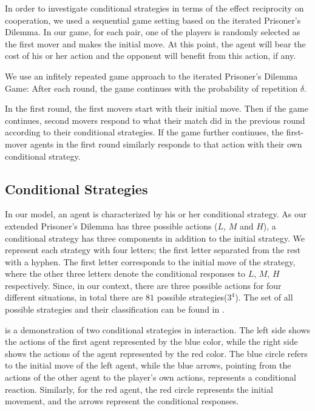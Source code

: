 \documentclass[12pt]{article}
\begin{document}
In order to investigate conditional strategies in terms of the effect reciprocity on cooperation, we used a sequential game setting based on the iterated Prisoner's Dilemma. In our game, for each pair, one of the players is randomly selected as the first mover and makes the initial move. At this point, the agent will bear the cost of his or her action and the opponent will benefit from this action, if any. 

We use an infitely repeated game approach to the iterated Prisoner's Dilemma Game: After each round, the game continues with the probability of repetition $\delta$. 

In the first round, the first movers start with their initial move. Then if the game continues, second movers respond to what their match did in the previous round according to their conditional strategies. If the game further continues, the first-mover agents in the first round similarly responds to that action with their own conditional strategy. 

\subsection{Conditional Strategies}
In our model, an agent is characterized by his or her conditional strategy. As our extended Prisoner's Dilemma has three possible actions ($L$, $M$ and $H$), a conditional strategy has three components in addition to the initial strategy. We represent each strategy with four letters; the first letter separated from the rest with a hyphen. The first letter corresponds to the initial move of the strategy, where the other three letters denote the conditional responses to $L$, $M$, $H$ respectively. Since, in our context, there are three possible actions for four different situations, in total there are $81$ possible strategies($3^4$). The set of all possible strategies and their classification can be found in .

  is a demonstration of two conditional strategies in interaction. The left side shows the actions of the first agent represented by the blue color, while the right side shows the actions of the agent represented by the red color. The blue circle refers to the initial move of the left agent, while the blue arrows, pointing from the actions of the other agent to the player's own actions, represents a conditional reaction. Similarly, for the red agent, the red circle represents the initial movement, and the arrows represent the conditional responses.
\end{document}
